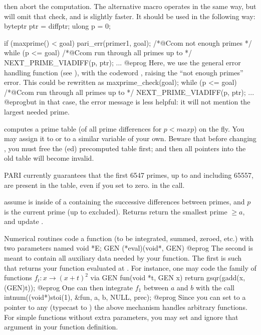 
\noindent then abort the computation. The alternative macro
 operates in the same way, but will omit that check,
and is slightly faster. It should be used in the following way:
%
\bprog
byteptr ptr = diffptr;
ulong p = 0;

if (maxprime() < goal) pari_err(primer1, goal); /*@Ccom not enough primes */
while (p <= goal) /*@Ccom run through all primes up to  */
{
  NEXT_PRIME_VIADIFF(p, ptr);
  ...
}
@eprog\noindent
Here, we use the general error handling function  (see
), with the codeword , raising the ``not enough
primes'' error. This could be rewritten as
\bprog
maxprime_check(goal);
while (p <= goal) /*@Ccom run through all primes up to  */
{
  NEXT_PRIME_VIADIFF(p, ptr);
  ...
}
@eprog\noindent but in that case, the error message is less helpful: it will
not mention the largest needed prime.

 computes a prime table (of all prime
differences for $p < maxp$) on the fly. You may assign it to  or
to a similar variable of your own. Beware that before changing ,
you must free the (ed) precomputed table first; and then all
pointers into the old table will become invalid.

PARI currently guarantees that the first 6547 primes, up to and including
65557, are present in the table, even if you set  to zero.
in the  call.

assume  is inside of a  containing the successive
differences between primes, and $p$ is the current prime (up to 
excluded). Returns return the smallest prime $\geq a$, and update .


Numerical routines code a function (to be integrated, summed, zeroed, etc.)
with two parameters named
\bprog
  void *E;
  GEN (*eval)(void*, GEN)
@eprog\noindent
The second is meant to contain all auxiliary data needed by your function.
The first is such that  returns your function evaluated at
. For instance, one may code the family of functions
$f_t: x \to (x+t)^2$ via
\bprog
GEN fun(void *t, GEN x) { return gsqr(gadd(x, (GEN)t)); }
@eprog\noindent
One can then integrate $f_1$ between $a$ and $b$ with the call
\bprog
intnum((void*)stoi(1), &fun, a, b, NULL, prec);
@eprog\noindent
Since you can set  to a pointer to any  (typecast to
) the above mechanism handles arbitrary functions. For simple
functions without extra parameters, you may set  and ignore
that argument in your function definition.

